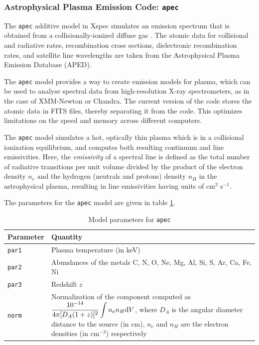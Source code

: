 			\subsubsection{Astrophysical Plasma Emission Code: \texttt{apec}}
				The \texttt{apec} additive model in Xspec simulates an emission spectrum that is obtained from a collisionally-ionized diffuse gas \cite{smithAPEC}. The atomic data for collisional and radiative rates, recombination cross sections, dielectronic recombination rates, and satellite line wavelengths are taken from the Astrophysical Plasma Emission Database (APED).
			
				The \texttt{apec} model provides a way to create emission models for plasma, which can be used to analyse spectral data from high-resolution X-ray spectrometers, as in the case of XMM-Newton or Chandra. The current version of the code stores the atomic data in FITS files, thereby separating it from the code. This optimizes limitations on the speed and memory across different computers.
			
				The \texttt{apec} model simulates a hot, optically thin plasma which is in a collisional ionization equilibrium, and computes both resulting continuum and line emissivities. Here, the \textit{emissivity} of a spectral line is defined as the  total number of radiative transitions per unit volume divided by the product of the electron density $n_e$ and the hydrogen (neutrals and protons) density $n_H$ in the astrophysical plasma, resulting in line emissivities having units of cm$^3$ s$^{-1}$.
			
				The parameters for the \texttt{apec} model are given in table \ref{param:apec}.
				\begin{table}[h!]
					\centering
					\caption{Model parameters for \texttt{apec}}
					\label{param:apec}
					\begin{tabular}{p{}p{}}
						\hline
						\textbf{Parameter} & \textbf{Quantity} \\ \hline
						{\texttt{par1}} & {Plasma temperature (in keV)} \\ %
						{\texttt{par2}} & {Abundances of the metals C, N, O, Ne, Mg, Al, Si, S, Ar, Ca, Fe, Ni} \\ %
						{\texttt{par3}} & {Redshift $z$} \\ %
						{\texttt{norm}} & {Normalization of the component computed as $\displaystyle\dfrac{10^{-14}}{4\pi[D_A(1+z)]^2}\int{n_en_H\mathrm{d}V}$, where $D_A$ is the angular diameter distance to the source (in cm), $n_e$ and $n_H$ are the electron densities (in cm$^{-3}$) respectively} \\ \hline
					\end{tabular}
				\end{table}

